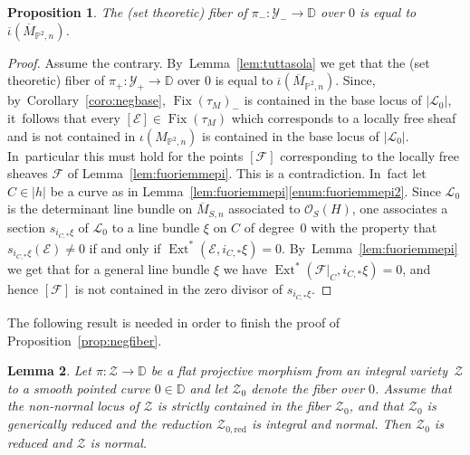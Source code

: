 \documentclass[11pt]{article}
\newcommand{\DD}{{\mathbb D}}
\newcommand{\PP}{{\mathbb P}}\let\P\PP
\newcommand\cE{\mathcal{E}}
\newcommand\cF{\mathcal{F}}
\newcommand\cL{\mathcal{L}}
\newcommand\cO{\mathcal{O}}
\newcommand\cY{\mathcal{Y}}
\DeclareMathOperator{\Ext}{Ext}
\DeclareMathOperator{\Fix}{Fix}
\let\ov\overline
\newtheorem{lemm}{Lemma}[section]
\newtheorem{prop}[lemm]{Proposition}
\theoremstyle{definition}
\begin{document}
\begin{prop}\label{prop:tuttasola}
The (set theoretic) fiber of $\pi_{-}\colon\cY_{-}\to\DD$ over $0$ is equal to $\ov{\iota}(\ov{M}_{\PP^2,n})$.
\end{prop}

\begin{proof}
Assume the contrary. By~Lemma~\ref{lem:tuttasola} we get that the (set theoretic) fiber of $\pi_{+}\colon\cY_{+}\to\DD$ over $0$ is equal to
$\ov{\iota}(\ov{M}_{\PP^2,n})$. Since, by~Corollary~\ref{coro:negbase}, $\Fix(\tau_M)_{-}$ is contained in the base locus of $|\cL_0|$, it~follows that every $[\cE]\in \Fix(\tau_M)$ which corresponds to a locally free sheaf and is not contained
in $\iota(M_{\PP^2,n})$ is contained in the base locus of $|\cL_0|$. In~particular this must hold for the points $[\cF]$ corresponding to the locally free sheaves $\cF$ of Lemma~\ref{lem:fuoriemmepi}. This is a contradiction. In~fact let $C\in|h|$ be a curve as in Lemma~\ref{lem:fuoriemmepi}\eqref{enum:fuoriemmepi2}.
Since $\cL_0$ is the determinant line bundle on $\ov{M}_{S,n}$ associated to $\cO_S(H)$, one associates a section $s_{i_{C,*}\xi}$ of $\cL_0$ to a line bundle $\xi$ on $C$ of degree~0 with the property
that $s_{i_{C,*}\xi}(\cE)\neq 0$ if and only if $\Ext^*(\cE,i_{C,*}\xi)=0$. By~Lemma~\ref{lem:fuoriemmepi} we get that for a general line bundle $\xi$
we have $\Ext^*(\cF\vert_{C},i_{C,*}\xi)=0$, and hence $[\cF]$ is not contained in the zero divisor of
$s_{i_{C,*}\xi}$.
\end{proof}

The following result is needed in order to finish the proof of Proposition~\ref{prop:negfiber}.

\begin{lemm}\label{lem:NormalityImpliesReduced}
Let $\pi\colon \mathcal{Z} \to \DD$ be a flat projective morphism from an integral variety~$\mathcal{Z}$ to a smooth pointed curve $0 \in \DD$ and let $\mathcal{Z}_0$ denote the fiber over $0$.
Assume that the non-normal locus of $\mathcal{Z}$ is strictly contained in the fiber $\mathcal{Z}_0$, and that $\mathcal{Z}_0$ is generically reduced and the reduction $\mathcal{Z}_{0,\mathrm{red}}$ is integral and normal.
Then $\mathcal{Z}_0$ is reduced and $\mathcal{Z}$ is normal.
\end{lemm}
\end{document}
